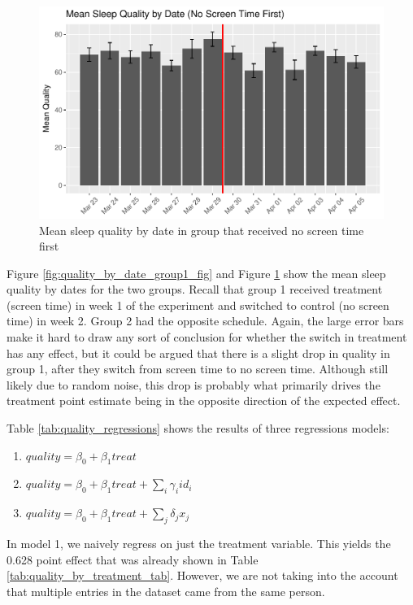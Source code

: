 \documentclass[]{article}
\providecommand{\tightlist}{%
  \setlength{\itemsep}{0pt}\setlength{\parskip}{0pt}}
\begin{document}
\begin{figure}
\centering
\includegraphics{report_files/figure-latex/quality_by_date_group2_fig-1.pdf}
\caption{\label{fig:quality_by_date_group2_fig} Mean sleep quality by
date in group that received no screen time first}
\end{figure}

Figure \ref{fig:quality_by_date_group1_fig} and Figure
\ref{fig:quality_by_date_group2_fig} show the mean sleep quality by
dates for the two groups. Recall that group 1 received treatment (screen
time) in week 1 of the experiment and switched to control (no screen
time) in week 2. Group 2 had the opposite schedule. Again, the large
error bars make it hard to draw any sort of conclusion for whether the
switch in treatment has any effect, but it could be argued that there is
a slight drop in quality in group 1, after they switch from screen time
to no screen time. Although still likely due to random noise, this drop
is probably what primarily drives the treatment point estimate being in
the opposite direction of the expected effect.

Table \ref{tab:quality_regressions} shows the results of three
regressions models:

\begin{enumerate}
\def\labelenumi{\arabic{enumi}.}
\tightlist
\item
  \(quality = \beta_0 + \beta_1 treat\)
\item
  \(quality = \beta_0 + \beta_1 treat + \sum_i \gamma_i id_i\)
\item
  \(quality = \beta_0 + \beta_1 treat + \sum_j \delta_j x_j\)
\end{enumerate}

In model 1, we naively regress on just the treatment variable. This
yields the 0.628 point effect that was already shown in Table
\ref{tab:quality_by_treatment_tab}. However, we are not taking into the
account that multiple entries in the dataset came from the same person.
\end{document}
